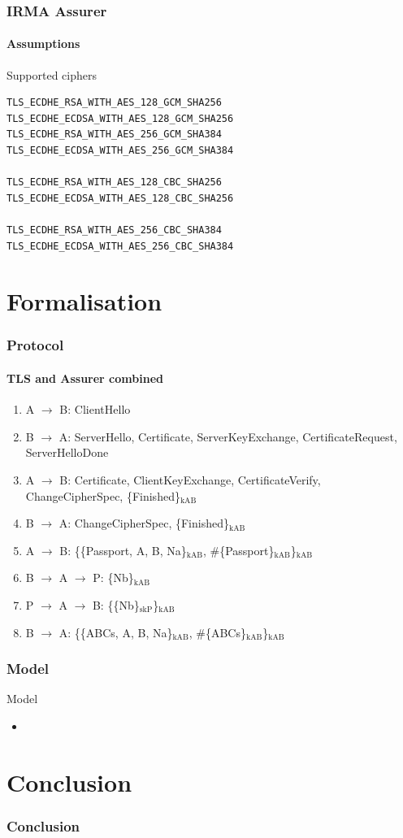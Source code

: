 \documentclass[hyperref={urlcolor=black, citecolor=black, pdfpagemode=UseNone, pdfpagelayout=SinglePage, pdfstartview=}]{beamer}
\begin{document}
\begin{frame}[fragile]
  \frametitle{IRMA Assurer}
  \framesubtitle{Assumptions}
  \begin{block}{Supported ciphers}
  \begin{verbatim}
TLS_ECDHE_RSA_WITH_AES_128_GCM_SHA256
TLS_ECDHE_ECDSA_WITH_AES_128_GCM_SHA256
TLS_ECDHE_RSA_WITH_AES_256_GCM_SHA384
TLS_ECDHE_ECDSA_WITH_AES_256_GCM_SHA384

TLS_ECDHE_RSA_WITH_AES_128_CBC_SHA256
TLS_ECDHE_ECDSA_WITH_AES_128_CBC_SHA256

TLS_ECDHE_RSA_WITH_AES_256_CBC_SHA384
TLS_ECDHE_ECDSA_WITH_AES_256_CBC_SHA384
  \end{verbatim}
  \end{block}
\end{frame}

\section{Formalisation}
\begin{frame}
\scriptsize
  \frametitle{Protocol}
  \framesubtitle{TLS and Assurer combined}
    \begin{enumerate}
      \item A $\rightarrow$ B: ClientHello
      \item B $\rightarrow$ A: ServerHello, Certificate, ServerKeyExchange, CertificateRequest, ServerHelloDone
      \item A $\rightarrow$ B: Certificate, ClientKeyExchange, CertificateVerify, ChangeCipherSpec, \{Finished\}$_\text{kAB}$
      \item B $\rightarrow$ A: ChangeCipherSpec, \{Finished\}$_\text{kAB}$
      \item A $\rightarrow$ B: \{\{Passport, A, B, Na\}$_\text{kAB}$, \#\{Passport\}$_\text{kAB}$\}$_\text{kAB}$
      \item B $\rightarrow$ A $\rightarrow$ P: \{Nb\}$_\text{kAB}$
      \item P $\rightarrow$ A $\rightarrow$ B: \{\{Nb\}$_\text{skP}$\}$_\text{kAB}$
      \item B $\rightarrow$ A: \{\{ABCs, A, B, Na\}$_\text{kAB}$, \#\{ABCs\}$_\text{kAB}$\}$_\text{kAB}$
    \end{enumerate}
\end{frame}

\begin{frame}
  \frametitle{Model}
  \begin{block}{Model}
    \begin{itemize}
      \item 
    \end{itemize}
  \end{block}
\end{frame}

\section{Conclusion}
\begin{frame}
  \frametitle{Conclusion}
\end{frame}
\end{document}
